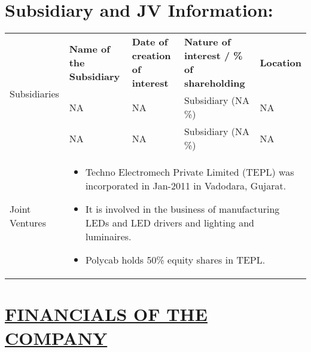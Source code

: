 \documentclass{article}
\begin{document}
\begin{tcolorbox}[colback=white]    
\end{tcolorbox}



\section*{Subsidiary and JV Information:}

\begin{longtable}{|p{3cm}|p{4cm}|p{3cm}|p{3cm}|p{2cm}|} %
\hline
\multirow{3}{*}{Subsidiaries} & \textbf{Name of the Subsidiary} & \textbf{Date of creation of interest} & \textbf{Nature of interest / \% of shareholding} & \textbf{Location} \\
\cline{2-5}
& NA & NA & Subsidiary (NA \%) & NA \\
\cline{2-5}
& NA & NA & Subsidiary (NA \%) & NA \\
\hline
\multirow{3}{*}{Joint Ventures} & \multicolumn{4}{|p{12cm}|}{\begin{itemize} %
    \renewcommand\labelitemi{--}
    \item Techno Electromech Private Limited (TEPL) was incorporated in Jan-2011 in Vadodara, Gujarat.
    \item It is involved in the business of manufacturing LEDs and LED drivers and lighting and luminaires.
    \item Polycab holds 50\% equity shares in TEPL.
\end{itemize}} \\
\hline %
\end{longtable}



\section*{\underline{FINANCIALS OF THE COMPANY}}
\end{document}
